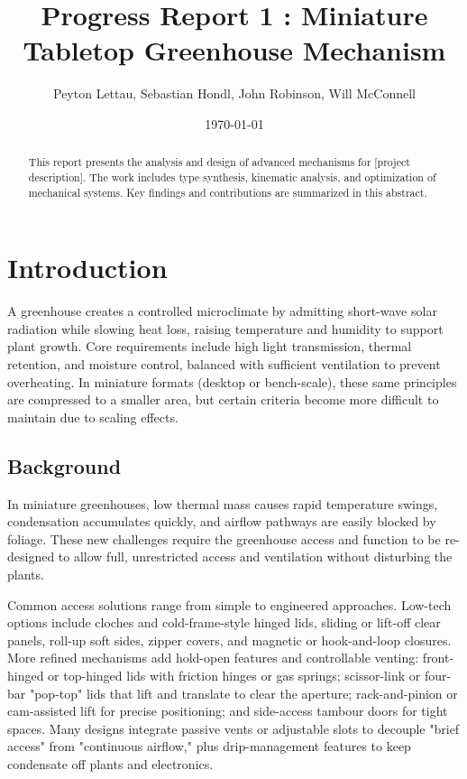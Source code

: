 \documentclass[12pt]{article}
\title{Progress Report 1 : Miniature Tabletop Greenhouse Mechanism}
\author{Peyton Lettau, Sebastian Hondl, John Robinson, Will McConnell}
\date{\today}
\begin{document}
\maketitle

\begin{abstract}
This report presents the analysis and design of advanced mechanisms for [project description]. The work includes type synthesis, kinematic analysis, and optimization of mechanical systems. Key findings and contributions are summarized in this abstract.
\end{abstract}

\tableofcontents
\newpage

\section{Introduction}
\label{sec:introduction}

A greenhouse creates a controlled microclimate by admitting short-wave solar radiation while slowing heat loss, raising temperature and humidity to support plant growth. Core requirements include high light transmission, thermal retention, and moisture control, balanced with sufficient ventilation to prevent overheating. In miniature formats (desktop or bench-scale), these same principles are compressed to a smaller area, but certain criteria become more difficult to maintain due to scaling effects.

\subsection{Background}
\label{sec:background}

In miniature greenhouses, low thermal mass causes rapid temperature swings, condensation accumulates quickly, and airflow pathways are easily blocked by foliage. These new challenges require the greenhouse access and function to be re-designed to allow full, unrestricted access and ventilation without disturbing the plants.

Common access solutions range from simple to engineered approaches. Low-tech options include cloches and cold-frame-style hinged lids, sliding or lift-off clear panels, roll-up soft sides, zipper covers, and magnetic or hook-and-loop closures. More refined mechanisms add hold-open features and controllable venting: front-hinged or top-hinged lids with friction hinges or gas springs; scissor-link or four-bar "pop-top" lids that lift and translate to clear the aperture; rack-and-pinion or cam-assisted lift for precise positioning; and side-access tambour doors for tight spaces. Many designs integrate passive vents or adjustable slots to decouple "brief access" from "continuous airflow," plus drip-management features to keep condensate off plants and electronics.
\end{document}
